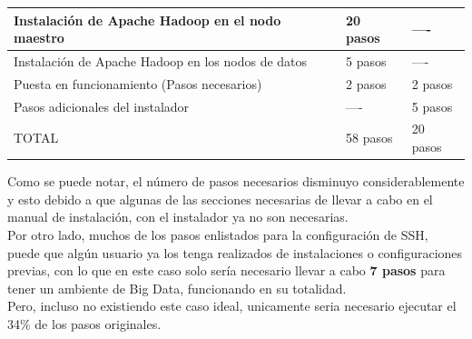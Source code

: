 \begin{table}[]
\begin{tabular}{|l|l|l|}
Instalación de Apache Hadoop en el nodo maestro         & 20 pasos                                                                                  & ----                                                                           \\ \hline
Instalación de Apache Hadoop en los nodos de datos      & 5 pasos                                                                                   & ----                                                                           \\ \hline
Puesta en funcionamiento (Pasos necesarios)             & 2 pasos                                                                                   & 2 pasos                                                                        \\ \hline
Pasos adicionales del instalador                        & ----                                                                                      & 5 pasos                                                                        \\ \hline
TOTAL                                                   & 58 pasos                                                                                  & 20 pasos                                                                       \\ \hline
\end{tabular}
\end{table}
Como se puede notar, el número de pasos necesarios disminuyo considerablemente y esto debido a que algunas de las secciones necesarias de llevar a cabo en el manual de instalación, con el instalador ya no son necesarias.
\\
Por otro lado, muchos de los pasos enlistados para la configuración de SSH, puede que algún usuario ya los tenga realizados de instalaciones o configuraciones previas, con lo que en este caso solo sería necesario llevar a cabo \textbf{7 pasos} para tener un ambiente de Big Data, funcionando en su totalidad.\\
Pero, incluso no existiendo este caso ideal, unicamente seria necesario ejecutar el 34\% de los pasos originales. 
\\

